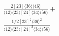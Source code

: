 \documentclass[varwidth, border=5pt]{standalone}
\begin{document}
\begin{my}
$\begin{gathered}
\scriptscriptstyle\frac{2[23]⟨36⟩⟨46⟩}{⟨12⟩⟨23⟩[24]⟨34⟩⟨56⟩}+\\
\scriptscriptstyle\frac{1/2[23]^2⟨36⟩^2}{⟨12⟩⟨23⟩[24]^2⟨34⟩⟨56⟩}\phantom{+}
\end{gathered}$
\end{my}
\end{document}
